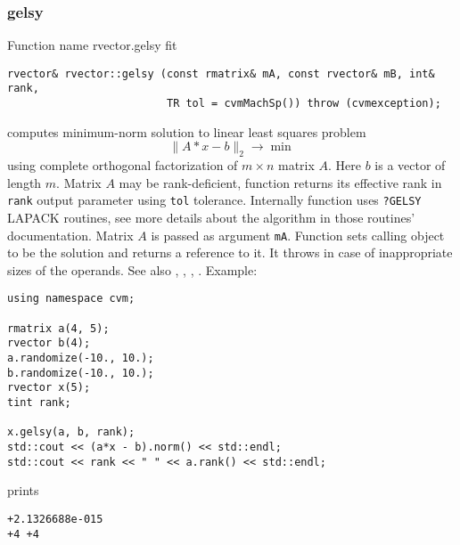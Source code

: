 \subsubsection{gelsy}
Function%
\pdfdest name {rvector.gelsy} fit
\begin{verbatim}
rvector& rvector::gelsy (const rmatrix& mA, const rvector& mB, int& rank,
                         TR tol = cvmMachSp()) throw (cvmexception);
\end{verbatim}
computes minimum-norm solution to linear
least squares problem 
\begin{equation*}
\|A*x-b\|_2\to\min
\end{equation*}
using complete orthogonal factorization of $m\times n$ matrix $A$.
Here $b$ is a vector of length $m$.
Matrix $A$ may be rank-deficient, function returns its effective rank in \verb"rank"
output parameter using \verb"tol" tolerance.
Internally  function uses \verb"?GELSY" LAPACK routines, see more details
about the algorithm in those routines' documentation.
Matrix $A$ is passed as argument \verb"mA".
Function sets calling object to be the solution and returns a reference to it.
It throws
in case of inappropriate sizes of the operands.
See also , 
, , 
.
Example:
\begin{Verbatim}
using namespace cvm;

rmatrix a(4, 5);
rvector b(4);
a.randomize(-10., 10.);
b.randomize(-10., 10.);
rvector x(5);
tint rank;

x.gelsy(a, b, rank);
std::cout << (a*x - b).norm() << std::endl;
std::cout << rank << " " << a.rank() << std::endl;
\end{Verbatim}
prints
\begin{Verbatim}
+2.1326688e-015
+4 +4
\end{Verbatim}
\newpage


